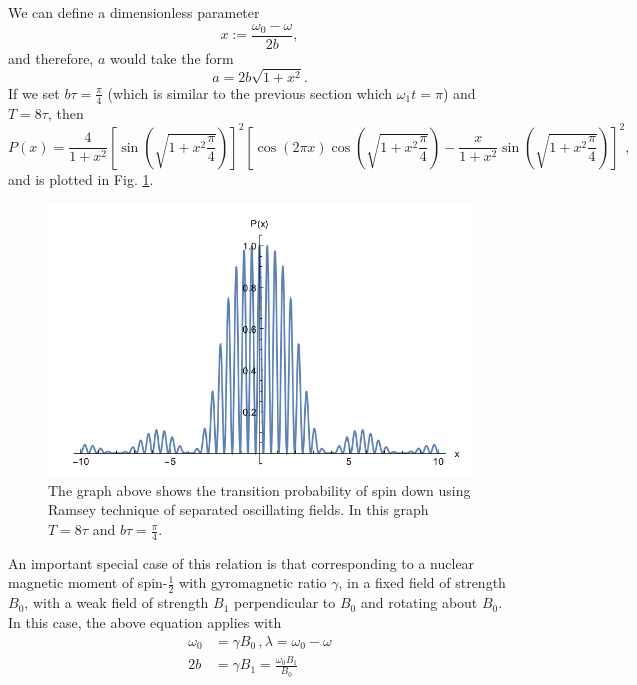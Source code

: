 %
We can define a dimensionless parameter
%
\begin{equation}
x:= \frac{\omega_0 - \omega}{2b} , 
\end{equation}
and therefore, $a$ would take the form 
\begin{equation}
a= 2b \sqrt{1+x^2} .
\end{equation}
If we set $b\tau = \frac{\pi}{4}$ (which is similar to the previous
section which $\omega_1 t= \pi$) and $T=8\tau$, then
%
\begin{equation}
P(x)= \frac{4}{1+x^2} \left[ \sin ( \sqrt{1+x^2 \frac{\pi}{4}}) \right]^2
\left[
\cos (2 \pi x) \cos (\sqrt{1+x^2 \frac{\pi}{4}}) - \frac{x}{1+x^2} \sin ( \sqrt{1+x^2 \frac{\pi}{4}}) \right] ^2 ,
\end{equation}
%
and is plotted in Fig. \ref{fig:transprob}.
\begin{figure}[h!]
  \centering
  \includegraphics[width=.8\textwidth]{p.png}
  \caption{ The graph above shows the transition probability of spin
    down using Ramsey technique of separated oscillating fields. In
    this graph $T=8\tau$ and $ b \tau = \frac{\pi}{4}$. }
  \label{fig:transprob}
\end{figure}

An important special case of this relation is that corresponding to a
nuclear magnetic moment of spin-$\frac{1}{2}$ with gyromagnetic ratio
$\gamma$, in a fixed field of strength $B_0$, with a weak field of
strength $B_1$ perpendicular to $B_0$ and rotating about $B_0$. In
this case, the above equation applies with
\begin{align}
\omega_0 &= \gamma B_0 \, , \lambda=\omega_0 - \omega \\
2b &= \gamma B_1 =\frac{\omega_0 B_1}{B_0}
\end{align}

